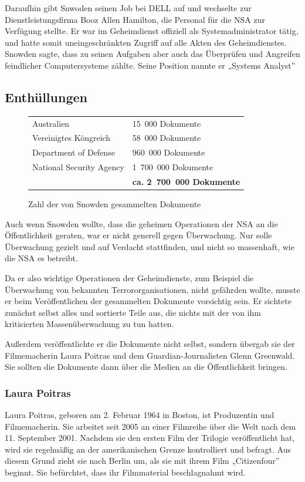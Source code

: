 \documentclass[12pt,a4paper]{scrartcl}
\begin{document}
Daraufhin gibt Snwoden seinen Job bei DELL auf und wechselte zur Dienstleistungsfirma Booz Allen Hamilton, die Personal für die NSA zur Verfügung stellte. Er war im Geheimdienst offiziell als Systemadministrator tätig, und hatte somit uneingeschränkten Zugriff auf alle Akten des Geheimdienstes. Snowden sagte, dass zu seinen Aufgaben aber auch das Überprüfen und Angreifen feindlicher Computersysteme zählte. Seine Position nannte er „Systems Analyst”

\subsection{Enthüllungen}

\begin{figure}[H]
\centering
\begin{tabular}{ll}
Australien & 15~000 Dokumente \\
Vereinigtes Köngreich & 58~000 Dokumente \\
Department of Defense & 960~000 Dokumente \\
National Security Agency & 1~700~000 Dokumente \\
& \textbf{ca. 2~700~000 Dokumente}
\end{tabular}
\caption{Zahl der von Snowden gesammelten Dokumente}
\end{figure}

Auch wenn Snowden wollte, dass die geheimen Operationen der NSA an die Öffentlichkeit geraten, war er nicht generell gegen Überwachung. Nur solle Überwachung gezielt und auf Verdacht stattfinden, und nicht so massenhaft, wie die NSA es betreibt. 

Da er also wichtige Operationen der Geheimdienste, zum Beispiel die Überwachung von bekannten Terrororganisationen, nicht gefährden wollte, musste er beim Veröffentlichen der gesammelten Dokumente vorsichtig sein. Er sichtete zunächst selbst alles und sortierte Teile aus, die nichts mit der von ihm kritisierten Massenüberwachung zu tun hatten.

Außerdem veröffentlichte er die Dokumente nicht selbst, sondern übergab sie der Filmemacherin Laura Poitras und dem Guardian-Journalisten Glenn Greenwald. Sie sollten die Dokumente dann über die Medien an die Öffentlichkeit bringen.

\subsubsection{Laura Poitras}
Laura Poitras, geboren am 2. Februar 1964 in Boston, ist Produzentin und Filmemacherin. Sie arbeitet seit 2005 an einer Filmreihe über die Welt nach dem 11. September 2001. Nachdem sie den ersten Film der Trilogie veröffentlicht hat, wird sie regelmäßig an der amerikanischen Grenze kontrolliert und befragt. Aus diesem Grund zieht sie nach Berlin um, als sie mit ihrem Film „Citizenfour” beginnt. Sie befürchtet, dass ihr Filmmaterial beschlagnahmt wird.\cite{praxisfilms}
\end{document}
